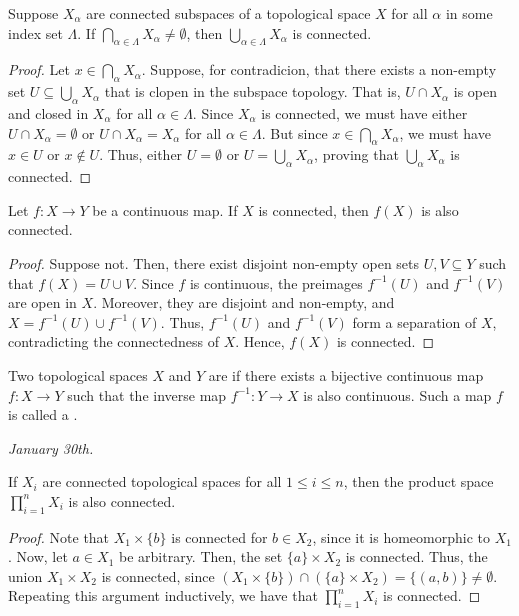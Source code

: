 \begin{theorem}
    Suppose $X_{\alpha}$ are connected subspaces of a topological space $X$ for all $\alpha$ in some index set $\Lambda$. If $\bigcap_{\alpha \in \Lambda} X_{\alpha} \neq \emptyset$, then $\bigcup_{\alpha \in \Lambda} X_{\alpha}$ is connected.
\end{theorem}
\begin{proof}
    Let $x \in \bigcap_{\alpha} X_{\alpha}$. Suppose, for contradicion, that there exists a non-empty set $U \subseteq \bigcup_{\alpha} X_{\alpha}$ that is clopen in the subspace topology. That is, $U \cap X_{\alpha}$ is open and closed in $X_{\alpha}$ for all $\alpha \in \Lambda$. Since $X_{\alpha}$ is connected, we must have either $U \cap X_{\alpha} = \emptyset$ or $U \cap X_{\alpha} = X_{\alpha}$ for all $\alpha \in \Lambda$. But since $x \in \bigcap_{\alpha} X_{\alpha}$, we must have $x \in U$ or $x \notin U$. Thus, either $U = \emptyset$ or $U = \bigcup_{\alpha} X_{\alpha}$, proving that $\bigcup_{\alpha} X_{\alpha}$ is connected.
\end{proof}

\begin{lemma}
    Let $f:X \to Y$ be a continuous map. If $X$ is connected, then $f(X)$ is also connected.
\end{lemma}
\begin{proof}
    Suppose not. Then, there exist disjoint non-empty open sets $U,V \subseteq Y$ such that $f(X) = U \cup V$. Since $f$ is continuous, the preimages $f^{-1}(U)$ and $f^{-1}(V)$ are open in $X$. Moreover, they are disjoint and non-empty, and $X = f^{-1}(U) \cup f^{-1}(V)$. Thus, $f^{-1}(U)$ and $f^{-1}(V)$ form a separation of $X$, contradicting the connectedness of $X$. Hence, $f(X)$ is connected.
\end{proof}

\begin{definition}
    Two topological spaces $X$ and $Y$ are  if there exists a bijective continuous map $f:X \to Y$ such that the inverse map $f^{-1} : Y \to X$ is also continuous. Such a map $f$ is called a .
\end{definition}

\textit{January 30th.}

\begin{theorem}
    If $X_{i}$ are connected topological spaces for all $1 \leq i \leq n$, then the product space $\prod_{i=1}^{n} X_{i}$ is also connected.
\end{theorem}
\begin{proof}
    Note that $X_{1} \times \{b\}$ is connected for $b \in X_{2}$, since it is homeomorphic to $X_{1}$. Now, let $a \in X_{1}$ be arbitrary. Then, the set $\{a\} \times X_{2}$ is connected. Thus, the union $X_{1} \times X_{2}$ is connected, since $(X_{1} \times \{b\}) \cap (\{a\} \times X_{2}) = \{(a,b)\} \neq \emptyset$. Repeating this argument inductively, we have that $\prod_{i=1}^{n} X_{i}$ is connected.
\end{proof}


